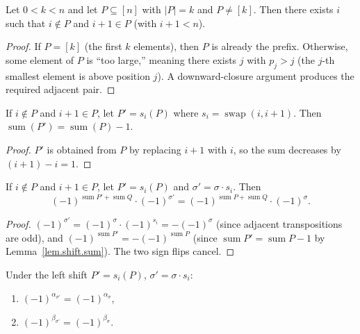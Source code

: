 \begin{lemma}
\label{lem.shift.exists}
\leanhelper
\leanok
Let $0 < k < n$ and let $P\subseteq [n]$ with $|P| = k$ and
$P \ne [k]$.  Then there exists $i$ such that $i \notin P$ and
$i+1 \in P$ (with $i+1 < n$).
\end{lemma}

\begin{proof}
\leanok
If $P = [k]$ (the first $k$ elements), then $P$ is already the
prefix.  Otherwise, some element of $P$ is ``too large,'' meaning
there exists $j$ with $p_j > j$ (the $j$-th smallest element is
above position $j$).  A downward-closure argument produces the
required adjacent pair.
\end{proof}

\begin{lemma}
\label{lem.shift.sum}
\leanhelper
\leanok
If $i\notin P$ and $i+1\in P$, let $P' = s_i(P)$ where
$s_i = \operatorname{swap}(i,i+1)$.  Then
$\operatorname{sum}(P') = \operatorname{sum}(P) - 1$.
\end{lemma}

\begin{proof}
\leanok
$P'$ is obtained from $P$ by replacing $i+1$ with $i$, so the sum
decreases by $(i+1)-i = 1$.
\end{proof}

\begin{lemma}
\label{lem.shift.combined.sign}
\leanhelper
\leanok
If $i\notin P$ and $i+1\in P$, let $P' = s_i(P)$ and $\sigma' = \sigma\cdot s_i$.
Then
\[
(-1)^{\operatorname{sum} P' + \operatorname{sum} Q}\cdot (-1)^{\sigma'}
= (-1)^{\operatorname{sum} P + \operatorname{sum} Q}\cdot (-1)^{\sigma}.
\]
\end{lemma}

\begin{proof}
$(-1)^{\sigma'} = (-1)^{\sigma}\cdot(-1)^{s_i} = -(-1)^{\sigma}$
(since adjacent transpositions are odd), and
$(-1)^{\operatorname{sum} P'} = -(-1)^{\operatorname{sum} P}$
(since $\operatorname{sum} P' = \operatorname{sum} P - 1$ by
Lemma~\ref{lem.shift.sum}).  The two sign flips cancel.
\end{proof}

\begin{lemma}
\label{lem.shift.extract}
\leanhelper
\leanok
Under the left shift $P' = s_i(P)$, $\sigma' = \sigma\cdot s_i$:
\begin{enumerate}
\item $(-1)^{\alpha_{\sigma'}} = (-1)^{\alpha_\sigma}$,
\item $(-1)^{\beta_{\sigma'}} = (-1)^{\beta_\sigma}$.
\end{enumerate}
\end{lemma}

